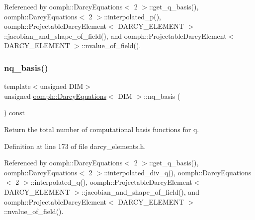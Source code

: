 Referenced by oomph\+::\+Darcy\+Equations$<$ 2 $>$\+::get\+\_\+q\+\_\+basis(), oomph\+::\+Darcy\+Equations$<$ 2 $>$\+::interpolated\+\_\+p(), oomph\+::\+Projectable\+Darcy\+Element$<$ D\+A\+R\+C\+Y\+\_\+\+E\+L\+E\+M\+E\+N\+T $>$\+::jacobian\+\_\+and\+\_\+shape\+\_\+of\+\_\+field(), and oomph\+::\+Projectable\+Darcy\+Element$<$ D\+A\+R\+C\+Y\+\_\+\+E\+L\+E\+M\+E\+N\+T $>$\+::nvalue\+\_\+of\+\_\+field().

\mbox{\label{classoomph_1_1DarcyEquations_abe00f95bb3c562a27799dd6dc3791c8c}} 
\subsubsection{\texorpdfstring{nq\+\_\+basis()}{nq\_basis()}}
{\footnotesize\ttfamily template$<$unsigned D\+IM$>$ \\
unsigned \hyperlink{classoomph_1_1DarcyEquations}{oomph\+::\+Darcy\+Equations}$<$ D\+IM $>$\+::nq\+\_\+basis (\begin{DoxyParamCaption}{ }\end{DoxyParamCaption}) const\hspace{0.3cm}{\ttfamily [inline]}}



Return the total number of computational basis functions for q. 



Definition at line 173 of file darcy\+\_\+elements.\+h.



Referenced by oomph\+::\+Darcy\+Equations$<$ 2 $>$\+::get\+\_\+q\+\_\+basis(), oomph\+::\+Darcy\+Equations$<$ 2 $>$\+::interpolated\+\_\+div\+\_\+q(), oomph\+::\+Darcy\+Equations$<$ 2 $>$\+::interpolated\+\_\+q(), oomph\+::\+Projectable\+Darcy\+Element$<$ D\+A\+R\+C\+Y\+\_\+\+E\+L\+E\+M\+E\+N\+T $>$\+::jacobian\+\_\+and\+\_\+shape\+\_\+of\+\_\+field(), and oomph\+::\+Projectable\+Darcy\+Element$<$ D\+A\+R\+C\+Y\+\_\+\+E\+L\+E\+M\+E\+N\+T $>$\+::nvalue\+\_\+of\+\_\+field().

\mbox{\label{classoomph_1_1DarcyEquations_a13cbb6dce25734c0d3844466b0435d17}} 
